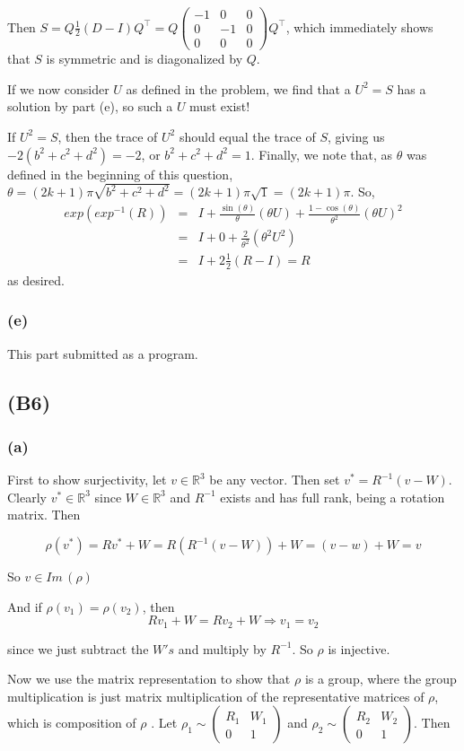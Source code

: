 \documentclass{article}
\newcommand{\threematrix}[9]{\left(\begin{array}{ccc} #1 & #2 & #3\\ #4 & #5 & #6 \\ #7 & #8 & #9 \end{array}\right)}
\begin{document}
Then $S = Q\frac{1}{2}(D - I)Q^\top = Q\threematrix{-1}{0}{0}{0}{-1}{0}{0}{0}{0}Q^\top$, which immediately shows that $S$ is symmetric and is diagonalized by $Q$.

If we now consider $U$ as defined in the problem, we find that a $U^2=S$ has a solution by part (e), so such a $U$ must exist!

If $U^2 = S$, then the trace of $U^2$ should equal the trace of $S$, giving us 
$-2(b^2 + c^2 + d^2) = -2$, or $b^2 + c^2 + d^2 = 1$.
Finally, we note that, as $\theta$ was defined in the beginning of this question, $\theta = (2k+1)\pi \sqrt{b^2 + c^2 + d^2} = (2k+1)\pi\sqrt{1} = (2k+1)\pi$. So,
\begin{eqnarray*}
  exp(exp^{-1}(R)) &=&  I + \frac{\sin(\theta)}{\theta}(\theta U) + \frac{1-\cos(\theta)}{\theta^2} (\theta U)^2\\
  &=&  I + 0 + \frac{2}{\theta^2}(\theta^2 U^2) \\
  &=&  I + 2\frac{1}{2}(R - I) = R
\end{eqnarray*}
as desired.
\subsubsection{(e)}
This part submitted as a program.

\subsection{(B6)}

\subsubsection{(a)} First to show surjectivity, let $v \in \mathbb{R}^3$ be any vector. Then set $v^* = R^{-1} (v - W)$. Clearly $v^* \in \mathbb{R}^3$ since $W \in \mathbb{R}^3$ and $R^{-1}$ exists and has full rank, being a rotation matrix. Then

\[ \rho(v^*) = R v^* + W = R (R^{-1} (v - W)) + W = (v - w) + W = v \]

So $v \in Im \, (\rho) $

And if $\rho(v_1) = \rho(v_2)$, then
\[ Rv_1 + W = Rv_2 + W \Longrightarrow v_1 = v_2 \]

since we just subtract the $W's$ and multiply by $R^{-1}$. So $\rho$ is injective. 

Now we use the matrix representation to show that $\rho$ is a group, where the group multiplication is just matrix multiplication of the representative matrices of $\rho$, which is composition of $\rho$ . Let $\rho_1 \sim \left(\begin{array}{cc} R_1 & W_1 \\ 0 & 1 \end{array}\right)$ and $\rho_2 \sim \left( \begin{array}{cc} R_2 & W_2 \\ 0 & 1 \end{array}\right)$. Then 
\end{document}
